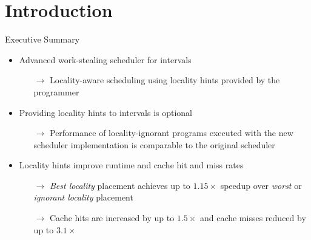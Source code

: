 \note{
}


\section*{Introduction}

\begin{frame}{Executive Summary}
  \begin{itemize}
  \item Advanced work-stealing scheduler for intervals
    \begin{itemize}
    \item[$\rightarrow$] Locality-aware scheduling using locality
      hints provided by the programmer
    \end{itemize}
  \item Providing locality hints to intervals is optional
    \begin{itemize}
    \item[$\rightarrow$] Performance of locality-ignorant programs
      executed with the new scheduler implementation is comparable to
      the original scheduler
    \end{itemize}
  \item Locality hints improve runtime and cache hit and miss rates
    \begin{itemize}
    \item[$\rightarrow$] \emph{Best locality} placement achieves up to
      $1.15\times$ speedup over \emph{worst} or \emph{ignorant
        locality} placement
    \item[$\rightarrow$] Cache hits are increased by up to $1.5\times$
      and cache misses reduced by up to $3.1\times$
    \end{itemize}
  \end{itemize}
\end{frame}

